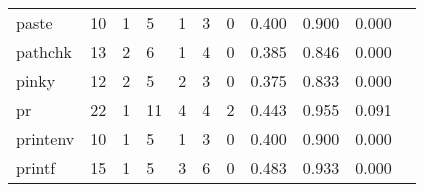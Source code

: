 \begin{longtable}{lp{1.2cm}p{1.2cm}p{1.2cm}p{1.2cm}p{1.2cm}p{1.2cm}p{1.2cm}p{1.2cm}p{1.2cm}p{1.2cm}}
paste     &                                    10 &                                                  1 &                                                  5 &                                                  1 &                                                  3 &                                                  0 &                                         0.400 &                                              0.900 &                                              0.000 \\
pathchk   &                                    13 &                                                  2 &                                                  6 &                                                  1 &                                                  4 &                                                  0 &                                         0.385 &                                              0.846 &                                              0.000 \\
pinky     &                                    12 &                                                  2 &                                                  5 &                                                  2 &                                                  3 &                                                  0 &                                         0.375 &                                              0.833 &                                              0.000 \\
pr        &                                    22 &                                                  1 &                                                 11 &                                                  4 &                                                  4 &                                                  2 &                                         0.443 &                                              0.955 &                                              0.091 \\
printenv  &                                    10 &                                                  1 &                                                  5 &                                                  1 &                                                  3 &                                                  0 &                                         0.400 &                                              0.900 &                                              0.000 \\
printf    &                                    15 &                                                  1 &                                                  5 &                                                  3 &                                                  6 &                                                  0 &                                         0.483 &                                              0.933 &                                              0.000 \\

\end{longtable}

